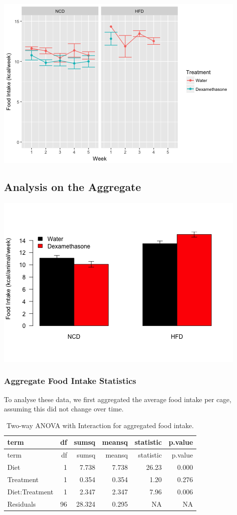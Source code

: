 \documentclass[]{article}
\begin{document}
\includegraphics{figures/weekly-food-intake-1.png}

\subsection{Analysis on the Aggregate}\label{analysis-on-the-aggregate}

\includegraphics{figures/overall-food-intake-1.png}

\subsubsection{Aggregate Food Intake
Statistics}\label{aggregate-food-intake-statistics}

To analyse these data, we first aggregated the average food intake per
cage, assuming this did not change over time.

\begin{longtable}[]{@{}lrrrrr@{}}
\caption{Two-way ANOVA with Interaction for aggregated food
intake.}\tabularnewline
\toprule
term & df & sumsq & meansq & statistic & p.value\tabularnewline
\midrule
\endfirsthead
\toprule
term & df & sumsq & meansq & statistic & p.value\tabularnewline
\midrule
\endhead
Diet & 1 & 7.738 & 7.738 & 26.23 & 0.000\tabularnewline
Treatment & 1 & 0.354 & 0.354 & 1.20 & 0.276\tabularnewline
Diet:Treatment & 1 & 2.347 & 2.347 & 7.96 & 0.006\tabularnewline
Residuals & 96 & 28.324 & 0.295 & NA & NA\tabularnewline
\bottomrule
\end{longtable}
\end{document}
